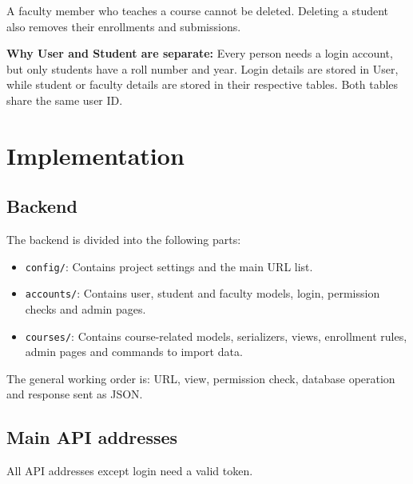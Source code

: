 \documentclass[11pt,a4paper]{article}
\begin{document}
A faculty member who teaches a course cannot be deleted. Deleting a student
also removes their enrollments and submissions.

\textbf{Why User and Student are separate:} Every person needs a login account,
but only students have a roll number and year. Login details are stored in User,
while student or faculty details are stored in their respective tables. Both
tables share the same user ID.

\section{Implementation}

\subsection{Backend}
The backend is divided into the following parts:
\begin{itemize}
    \item \texttt{config/}: Contains project settings and the main URL list.
    \item \texttt{accounts/}: Contains user, student and faculty models, login,
    permission checks and admin pages.
    \item \texttt{courses/}: Contains course-related models, serializers, views,
    enrollment rules, admin pages and commands to import data.
\end{itemize}

The general working order is: URL, view, permission check, database operation
and response sent as JSON.

\subsection{Main API addresses}
All API addresses except login need a valid token.
\end{document}
